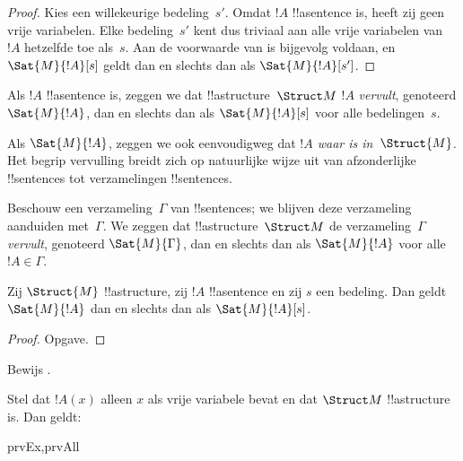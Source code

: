 \documentclass[openany]{memoir}
\begin{document}
\begin{proof}
  Kies een willekeurige bedeling~$s'$. Omdat $!A$ !!a{sentence} is,
  heeft zij geen vrije variabelen. Elke bedeling~$s'$ kent dus triviaal
  aan alle vrije variabelen van~$!A$ hetzelfde toe als~$s$. Aan de
  voorwaarde van  is bijgevolg voldaan, en
  $\Sat{M}{!A}[s]$ geldt dan en slechts dan als
  $\Sat{M}{!A}[s']$.
\end{proof}

\begin{defn}
Als $!A$ !!a{sentence} is, zeggen we dat !!a{structure}~$\Struct M$
$!A$ \emph{vervult}, genoteerd $\Sat{M}{!A}$, dan en slechts dan als
$\Sat{M}{!A}[s]$ voor alle bedelingen~$s$.
\end{defn}

Als $\Sat{M}{!A}$, zeggen we ook eenvoudigweg dat \emph{$!A$ waar is
in~$\Struct{M}$.} Het begrip vervulling breidt zich op natuurlijke
wijze uit van afzonderlijke !!{sentence}s tot verzamelingen
!!{sentence}s.

\begin{defn}
Beschouw een verzameling~$\Gamma$ van !!{sentence}s; we blijven deze
verzameling aanduiden met~$\Gamma$. We zeggen dat
!!a{structure}~$\Struct M$ de verzameling~$\Gamma$ \emph{vervult},
genoteerd $\Sat{M}{\Gamma}$, dan en slechts dan als
$\Sat{M}{!A}$ voor alle $!A \in \Gamma$.
\end{defn}

\begin{prop}
  Zij $\Struct{M}$ !!a{structure}, zij $!A$ !!a{sentence} en zij $s$
  een bedeling. Dan geldt $\Sat{M}{!A}$ dan en slechts dan als
  $\Sat{M}{!A}[s]$.
\end{prop}

\begin{proof}
Opgave.
\end{proof}

\begin{prob}
Bewijs .
\end{prob}

\begin{prop}
  Stel dat $!A(x)$ alleen $x$ als vrije variabele bevat en dat
  $\Struct M$ !!a{structure} is. Dan geldt:
  \begin{tagenumerate}{prvEx,prvAll}
\end{tagenumerate}
\end{prop}
\end{document}

